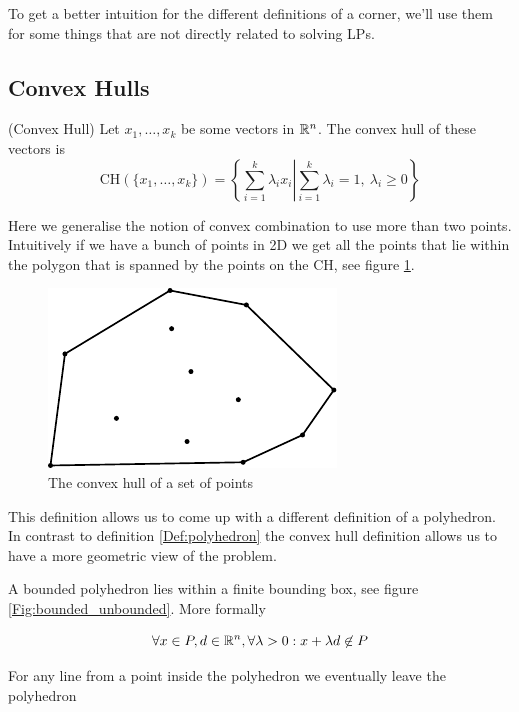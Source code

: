 To get a better intuition for the different definitions of a corner, we'll use them for some things that are not directly related to solving LPs.

\subsection*{Convex Hulls}

\begin{Def}(Convex Hull) Let $x_1,\ldots,x_k$ be some vectors in $\mathbb{R}^n$. The convex hull of these vectors is
\[\mbox{CH}(\{x_1,\ldots,x_k\}) = \left\{\sum _{i=1}^k \lambda_i x_i \left| \sum_{i=1}^k \lambda_i =1,\ \lambda_i\geq 0\right.\right\}\]
\end{Def}

Here we generalise the notion of convex combination to use more than two points. Intuitively if we have a bunch of points in 2D we get all the points that lie within the polygon that is spanned by the points on the CH, see figure \ref{Fig:convexHull}.

\begin{figure}[hbt]
\begin{center}
\includegraphics{./images/convex_hull.pdf}
\end{center}
\caption{The convex hull of a set of points}
\label{Fig:convexHull}
\end{figure}

This definition allows us to come up with a different definition of a polyhedron. In contrast to definition \ref{Def:polyhedron} the convex hull definition allows us to have a more geometric view of the problem.

\begin{Def} A bounded polyhedron lies within a finite bounding box, see figure \ref{Fig:bounded_unbounded}. More formally

\[\forall x\in P,d\in \mathbb{R}^n, \forall \lambda > 0: x+\lambda d \not \in P\]

For any line from a point inside the polyhedron we eventually leave the polyhedron
\end{Def}

